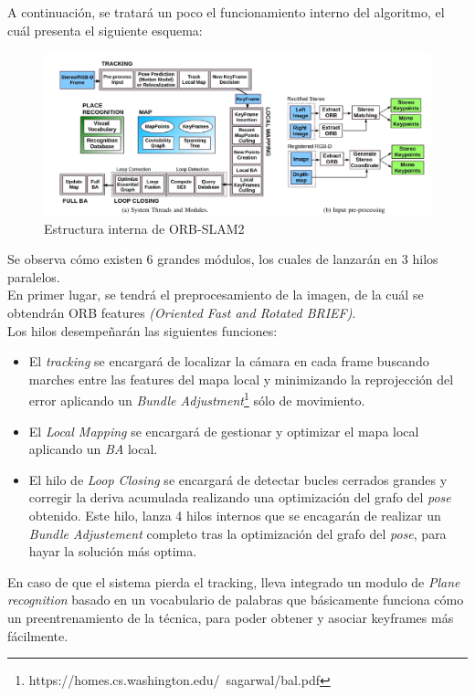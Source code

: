 A continuación, se tratará un poco el funcionamiento interno del algoritmo, el cuál presenta el siguiente esquema:
\begin{figure}[h!]
    \centering
    \includegraphics[width=1\textwidth]{images/orb_scheme}
    \caption{Estructura interna de ORB-SLAM2}
\end{figure}

Se observa cómo existen 6 grandes módulos, los cuales de lanzarán en 3 hilos paralelos. \\
En primer lugar, se tendrá el preprocesamiento de la imagen, de la cuál se obtendrán  ORB features 
\textit{(Oriented Fast and Rotated BRIEF)}. \\
Los hilos desempeñarán las siguientes funciones:
\begin{itemize}
    \item El \textit{tracking} se encargará de localizar la cámara en cada frame buscando marches entre las features
    del mapa local y minimizando la reprojección del error aplicando un \textit{Bundle Adjustment}\footnote{https://homes.cs.washington.edu/~sagarwal/bal.pdf} sólo de 
    movimiento.
    \item El \textit{Local Mapping} se encargará de gestionar y optimizar el mapa local aplicando un \textit{BA} local.
    \item El hilo de \textit{Loop Closing} se encargará de detectar bucles cerrados grandes y corregir la deriva acumulada
    realizando una optimización del grafo del \textit{pose} obtenido. Este hilo, lanza 4 hilos internos que se encagarán de
    realizar un \textit{Bundle Adjustement} completo tras la optimización del grafo del \textit{pose}, para hayar la solución
    más optima.
\end{itemize}

En caso de que el sistema pierda el tracking, lleva integrado un modulo de \textit{Plane recognition} basado en un vocabulario 
de palabras que básicamente funciona cómo un preentrenamiento de la técnica, para poder obtener y asociar keyframes más fácilmente. \\

